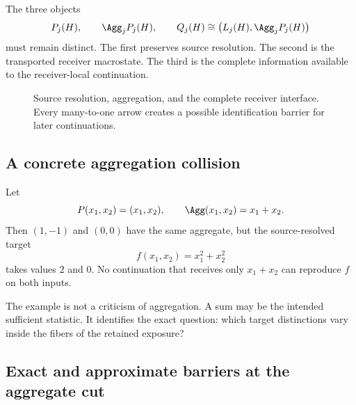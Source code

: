 The three objects
\[
P_j(H),
\qquad
\Agg_jP_j(H),
\qquad
Q_j(H)\cong\bigl(L_j(H),\Agg_jP_j(H)\bigr)
\]
must remain distinct. The first preserves source resolution. The second is the transported receiver macrostate. The third is the complete information available to the receiver-local continuation.

\begin{figure}[t]
\centering
{}
\caption{Source resolution, aggregation, and the complete receiver interface. Every many-to-one arrow creates a possible identification barrier for later continuations.}
\label{fig:interface-refinement}
\end{figure}

\subsection{A concrete aggregation collision}

\begin{example}\label{ex:aggregation-collision}
Let
\[
P(x_1,x_2)=(x_1,x_2),
\qquad
\Agg(x_1,x_2)=x_1+x_2.
\]
Then $(1,-1)$ and $(0,0)$ have the same aggregate, but the source-resolved target
\[
f(x_1,x_2)=x_1^2+x_2^2
\]
takes values $2$ and $0$. No continuation that receives only $x_1+x_2$ can reproduce $f$ on both inputs.
\end{example}

The example is not a criticism of aggregation. A sum may be the intended sufficient statistic. It identifies the exact question: which target distinctions vary inside the fibers of the retained exposure?

\subsection{Exact and approximate barriers at the aggregate cut}

